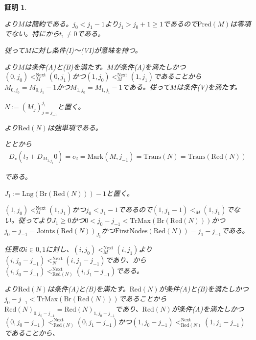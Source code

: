 \documentclass[dvipdfmx,uplatex]{jsarticle}
\theoremstyle{customnonumberbreakfortheorem}
\theoremstyle{customnonumberbreakforproof}
\newtheorem{hideableproof}{証明}
\begin{document}
\begin{hideableproof}
	\begin{indented}
		\item {}より\(M\)は簡約である。\(j_0 < j_1-1\)より\(j_1 > j_0+1 \geq 1\)であるので\(\textrm{Pred}(M)\)は零項でない。特にから\(t_1 \neq 0\)である。
		\item 従って\(M\)に対し条件(I)～(VI)が意味を持つ。
		\item {}より\(M\)は条件(A)と(B)を満たす。\(M\)が条件(A)を満たしかつ\((0,j_0) <_M^{\textrm{Next}} (0,j_1)\)かつ\((1,j_0) <_M^{\textrm{Next}} (1,j_1)\)であることから\(M_{0,j_0} = M_{0,j_1}-1\)かつ\(M_{1,j_0} = M_{1,j_1}-1\)である。従って\(M\)は条件(V)を満たす。
		\item \(N := (M_j)_{j=j_{-1}}^{j_1}\)と置く。
		\item {}より\(\textrm{Red}(N)\)は強単項である。
		\item {}ととから
		\begin{eqnarray*}
		D_v(t_2 + D_{M_{1,j_1}} 0) = c_2 = \textrm{Mark}(M,j_{-1}) = \textrm{Trans}(N) = \textrm{Trans}(\textrm{Red}(N))
		\end{eqnarray*}
		\item である。
		\item \(J_1 := \textrm{Lng}(\textrm{Br}(\textrm{Red}(N)))-1\)と置く。
		\item \((1,j_0) <_M^{\textrm{Next}} (1,j_1)\)かつ\(j_0 < j_1-1\)であるので\((1,j_1-1) <_M (1,j_1)\)でない。従ってより\(J_1 \geq 0\)かつ\(0 < j_0-j_{-1} < \textrm{TrMax}(\textrm{Br}(\textrm{Red}(N)))\)かつ\(j_0-j_{-1} = \textrm{Joints}(\textrm{Red}(N))_{J_1}\)かつ\(\textrm{FirstNodes}(\textrm{Red}(N)) = j_1-j_{-1}\)である。
		\item 任意の\(i \in {0,1}\)に対し、\((i,j_0) <_M^{\textrm{Next}} (i,j_1)\)より\((i,j_0-j_{-1}) <_N^{\textrm{Next}} (i,j_1-j_{-1})\)であり、から\((i,j_0-j_{-1}) <_{\textrm{Red}(N)}^{\textrm{Next}} (i,j_1-j_{-1})\)である。
		\item {}より\(\textrm{Red}(N)\)は条件(A)と(B)を満たす。\(\textrm{Red}(N)\)が条件(A)と(B)を満たしかつ\(j_0-j_{-1} < \textrm{TrMax}(\textrm{Br}(\textrm{Red}(N)))\)であることから\(\textrm{Red}(N)_{0,j_0-j_{-1}} = \textrm{Red}(N)_{1,j_0-j_{-1}}\)であり、\(\textrm{Red}(N)\)が条件(A)を満たしかつ\((0,j_0-j_{-1}) <_{\textrm{Red}(N)}^{\textrm{Next}} (0,j_1-j_{-1})\)かつ\((1,j_0-j_{-1}) <_{\textrm{Red}(N)}^{\textrm{Next}} (1,j_1-j_{-1})\)であることから、

\end{indented}
\end{hideableproof}
\end{document}
